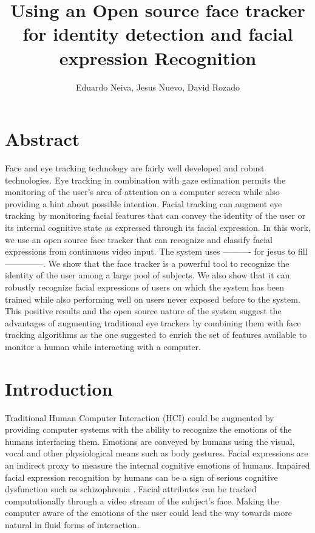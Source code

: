 \documentclass[]{article}
\title{Using an Open source face tracker for identity detection and facial expression Recognition}
\author{Eduardo Neiva, Jesus Nuevo, David Rozado}
\begin{document}
\maketitle

\section{Abstract}
Face and eye tracking technology are fairly well developed and robust technologies. Eye tracking in combination with
gaze estimation permits the monitoring of the user's area of attention on a computer screen while also providing a hint
about possible intention. Facial tracking can augment eye tracking by monitoring facial features that can convey the
identity of the user or its internal cognitive state as expressed through its facial expression. In this work, we use an
open source face tracker that can recognize and classify facial expressions from continuous video input. The system uses
---------- for jesus to fill --------------. We show that the face tracker is a powerful tool to recognize the identity
of the user among a large pool of subjects. We also show that it can robustly recognize facial expressions of users on
which the system has been trained while also performing well on users never exposed before to the system. This positive
results and the open source nature of the system suggest the advantages of augmenting traditional eye trackers by
combining them with face tracking algorithms as the one suggested to enrich the set of features available to monitor a
human while interacting with a computer.


\section{Introduction}
Traditional Human Computer Interaction (HCI) could be augmented by providing computer systems with the ability to
recognize the emotions of the humans interfacing them. Emotions are conveyed by humans  using the visual, vocal
and other physiological means such as body gestures. Facial expressions are an indirect proxy to measure the internal
cognitive emotions of humans. Impaired facial expression recognition by humans can be a sign of serious cognitive
dysfunction such as schizophrenia \cite{Edwards2002789}.  Facial attributes can be tracked computationally through a
video stream of the subject's face. Making the computer aware of the emotions of the user could lead the way towards
more natural in fluid forms of interaction.
\end{document}
